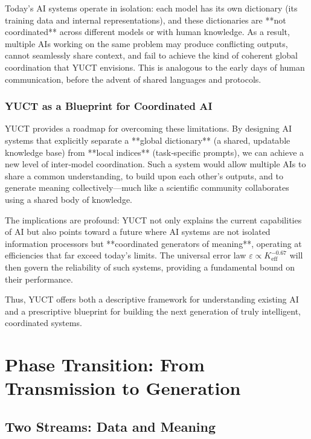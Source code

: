 \documentclass[12pt,a4paper]{article}
\theoremstyle{remark}
\newcommand{\Keff}{K_{\mathrm{eff}}}
\begin{document}
	Today's AI systems operate in isolation: each model has its own dictionary (its training data and internal representations), and these dictionaries are **not coordinated** across different models or with human knowledge. As a result, multiple AIs working on the same problem may produce conflicting outputs, cannot seamlessly share context, and fail to achieve the kind of coherent global coordination that YUCT envisions. This is analogous to the early days of human communication, before the advent of shared languages and protocols.
	
	\subsubsection{YUCT as a Blueprint for Coordinated AI}
	
	YUCT provides a roadmap for overcoming these limitations. By designing AI systems that explicitly separate a **global dictionary** (a shared, updatable knowledge base) from **local indices** (task‑specific prompts), we can achieve a new level of inter‑model coordination. Such a system would allow multiple AIs to share a common understanding, to build upon each other's outputs, and to generate meaning collectively—much like a scientific community collaborates using a shared body of knowledge.
	
	The implications are profound: YUCT not only explains the current capabilities of AI but also points toward a future where AI systems are not isolated information processors but **coordinated generators of meaning**, operating at efficiencies that far exceed today's limits. The universal error law $\varepsilon \propto \Keff^{-0.67}$ will then govern the reliability of such systems, providing a fundamental bound on their performance.
	
	Thus, YUCT offers both a descriptive framework for understanding existing AI and a prescriptive blueprint for building the next generation of truly intelligent, coordinated systems.
	
	\section{Phase Transition: From Transmission to Generation}
	\label{sec:transition}
	
	\subsection{Two Streams: Data and Meaning}
	
\end{document}
